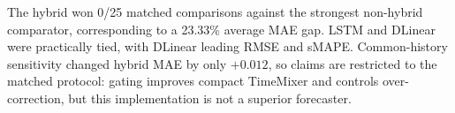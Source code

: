 The hybrid won 0/25 matched comparisons against the strongest non-hybrid comparator, corresponding to a 23.33\% average MAE gap. LSTM and DLinear were practically tied, with DLinear leading RMSE and sMAPE. Common-history sensitivity changed hybrid MAE by only \( +0.012 \), so claims are restricted to the matched protocol: gating improves compact TimeMixer and controls over-correction, but this implementation is not a superior forecaster.
